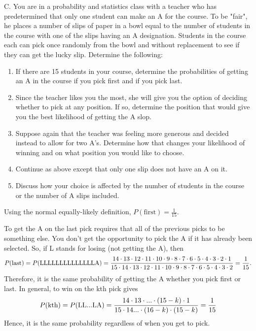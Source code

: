 \documentclass[10pt,]{book}
\theoremstyle{plain}
\theoremstyle{definition}
\theoremstyle{definition}
\theoremstyle{definition}
\numberwithin{equation}{section}
\begin{document}
	C. You are in a probability and statistics class with a teacher who has predetermined that only one student can make an A for the course. To be "fair", he places a number of slips of paper in a bowl equal to the number of students in the course with one of the slips having an A designation. Students in the course each can pick once randomly from the bowl and without replacement to see if they can get the lucky slip.  Determine the following:
	\leavevmode%
\begin{enumerate}
\item\hypertarget{li-119}{}If there are 15 students in your course, determine the probabilities of getting an A in the course if you pick first and if you pick last.%
\item\hypertarget{li-120}{}Since the teacher likes you the most, she will give you the option of deciding whether to pick at any position. If so, determine the position that would give you the best likelihood of getting the A slop.%
\item\hypertarget{li-121}{}Suppose again that the teacher was feeling more generous and decided instead to allow for two A's. Determine how that changes your likelihood of winning and on what position you would like to choose.%
\item\hypertarget{li-122}{}Continue as above except that only one slip does not have an A on it.%
\item\hypertarget{li-123}{}Discuss how your choice is affected by the number of students in the course or the number of A slips included.%
\end{enumerate}

	
	Using the normal equally-likely definition, \(P(\text{first}) = \frac{1}{15}\).
\par

	To get the A on the last pick requires that all of the previous picks to be something else. You don't get the opportunity to pick the A if it has already been selected. So, if L stands for losing (not getting the A), then 
	\begin{equation*} P(\text{last}) = P(\text{LLLLLLLLLLLLLLA}) \\ = \frac{14 \cdot 13 \cdot 12 \cdot 11 \cdot 10 \cdot 9  \cdot 8  \cdot 7  \cdot 6  \cdot 5  \cdot 4  \cdot 3  \cdot 2  \cdot 1}{15 \cdot 14 \cdot 13 \cdot 12 \cdot 11 \cdot 10 \cdot 9 \cdot 8 \cdot 7 \cdot 6 \cdot 5 \cdot 4 \cdot 3 \cdot 2} = \frac{1}{15}.\end{equation*}
	Therefore, it is the same probability of getting the A whether you pick first or last.  In general, to win on the kth pick gives
	\begin{equation*} P(\text{kth}) = P(\text{LL...LA}) \\ = \frac{14 \cdot 13 \cdot ... \cdot (15-k)  \cdot 1}{15 \cdot 14 ... \cdot (16-k) \cdot (15-k)} = \frac{1}{15}\end{equation*}
	Hence, it is the same probability regardless of when you get to pick.
\par
\end{document}
